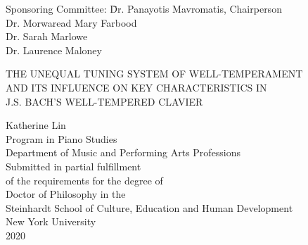 \documentclass[11pt,letterpaper]{report}
\begin{document}
\title{}
\author{}


\begin{titlepage}
    \thispagestyle{empty}
    \begin{singlespace}\centering\normalsize
        \begin{tabbing}
        \hspace{10ex}Sponsoring Committee: \= Dr. Panayotis Mavromatis, Chairperson\\
        \>Dr. Morwaread Mary Farbood\\
        \>Dr. Sarah Marlowe\\
        \>Dr. Laurence Maloney\\
        \end{tabbing}
        \vspace{1in}
        \begin{doublespace}
            THE UNEQUAL TUNING SYSTEM OF WELL-TEMPERAMENT \\
            AND ITS INFLUENCE ON KEY CHARACTERISTICS IN \\
            J.S. BACH'S WELL-TEMPERED CLAVIER
        \end{doublespace}
        \vspace{1in}
        Katherine Lin \\
        \vspace{.25in}
        Program in Piano Studies \\
        Department of Music and Performing Arts Professions\\
        \vfill
        Submitted in partial fulfillment \\
        of the requirements for the degree of \\
        Doctor of Philosophy in the \\
        Steinhardt School of Culture, Education and Human Development \\
        New York University \\
        2020 \\
    \end{singlespace}
\end{titlepage}
\setcounter{page}{2}

\end{document}
